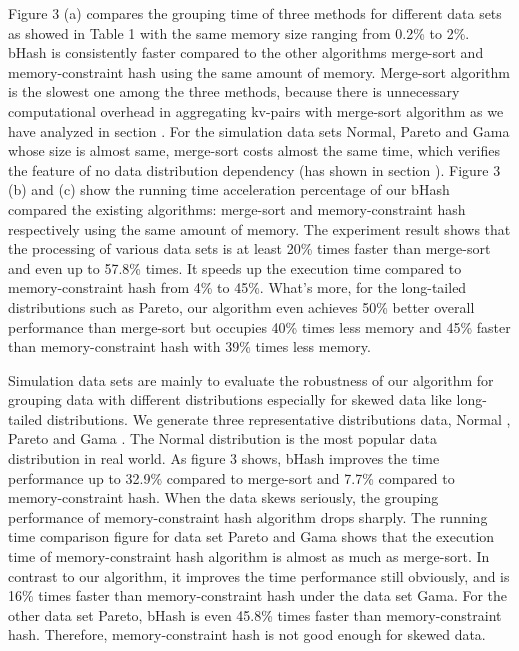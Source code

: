 Figure 3 (a) compares the grouping time of three methods for different data sets as showed in Table 1 with the same memory size ranging from 0.2\% to 2\%. bHash is consistently faster compared to the other algorithms merge-sort and memory-constraint hash using the same amount of memory. Merge-sort algorithm is the slowest one among the three methods, because there is unnecessary computational overhead in aggregating kv-pairs with merge-sort algorithm as we have analyzed in section \uppercase\expandafter{}. For the simulation data sets Normal, Pareto and Gama whose size is almost same, merge-sort costs almost the same time, which verifies the feature of no data distribution dependency (has shown in section \uppercase\expandafter{}). Figure 3 (b) and (c) show the running time acceleration percentage of our bHash compared the existing algorithms: merge-sort and memory-constraint hash respectively using the same amount of memory. The experiment result shows that the processing of various data sets is at least 20\% times faster than merge-sort and even up to 57.8\% times. It speeds up the execution time compared to memory-constraint hash from 4\% to 45\%. What's more, for the long-tailed distributions such as Pareto, our algorithm even achieves 50\% better overall performance than merge-sort but occupies 40\% times less memory and 45\% faster than memory-constraint hash with 39\% times less memory.

Simulation data sets are mainly to evaluate the robustness of our algorithm for grouping data with different distributions especially for skewed data like long-tailed distributions. We generate three representative distributions data, Normal \cite{marsaglia2004evaluating}, Pareto \cite{rootzen2006multivariate} and Gama \cite{minka2002estimating}. The Normal distribution is the most popular data distribution in real world. As figure 3 shows, bHash improves the time performance up to 32.9\% compared to merge-sort and 7.7\% compared to memory-constraint hash. When the data skews seriously, the grouping performance of memory-constraint hash algorithm drops sharply. The running time comparison figure for data set Pareto and Gama shows that the execution time of memory-constraint hash algorithm is almost as much as merge-sort. In contrast to our algorithm, it improves the time performance still obviously, and is 16\% times faster than memory-constraint hash under the data set Gama. For the other data set Pareto, bHash is even 45.8\% times faster than memory-constraint hash. Therefore, memory-constraint hash is not good enough for skewed data.

